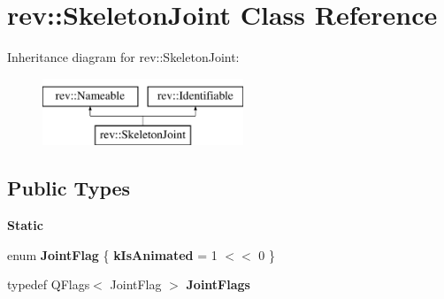 \hypertarget{classrev_1_1_skeleton_joint}{}\section{rev\+::Skeleton\+Joint Class Reference}
\label{classrev_1_1_skeleton_joint}
Inheritance diagram for rev\+::Skeleton\+Joint\+:\begin{figure}[H]
\begin{center}
\leavevmode
\includegraphics[height=2.000000cm]{classrev_1_1_skeleton_joint}
\end{center}
\end{figure}
\subsection*{Public Types}
\begin{Indent}\textbf{ Static}\par
\begin{DoxyCompactItemize}
\item 
\mbox{\label{classrev_1_1_skeleton_joint_a6f55620dd88e9d5d8bbfe4b7b79795dd}} 
enum {\bfseries Joint\+Flag} \{ {\bfseries k\+Is\+Animated} = 1 $<$$<$ 0
 \}
\item 
\mbox{\label{classrev_1_1_skeleton_joint_ad9097b57945cf4c8f42d9e8215774527}} 
typedef Q\+Flags$<$ Joint\+Flag $>$ {\bfseries Joint\+Flags}
\end{DoxyCompactItemize}
\end{Indent}
